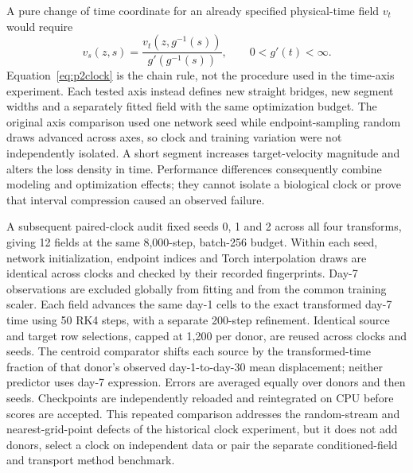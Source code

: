 A pure change of time coordinate for an already specified physical-time field $v_t$ would require
\begin{equation}
v_s(z,s)=\frac{v_t(z,g^{-1}(s))}{g'(g^{-1}(s))},\qquad 0<g'(t)<\infty.\label{eq:p2clock}
\end{equation}
Equation~\eqref{eq:p2clock} is the chain rule, not the procedure used in the time-axis experiment. Each tested axis instead defines new straight bridges, new segment widths and a separately fitted field with the same optimization budget. The original axis comparison used one network seed while endpoint-sampling random draws advanced across axes, so clock and training variation were not independently isolated. A short segment increases target-velocity magnitude and alters the loss density in time. Performance differences consequently combine modeling and optimization effects; they cannot isolate a biological clock or prove that interval compression caused an observed failure.

A subsequent paired-clock audit fixed seeds 0, 1 and 2 across all four transforms, giving 12 fields at the same 8,000-step, batch-256 budget. Within each seed, network initialization, endpoint indices and Torch interpolation draws are identical across clocks and checked by their recorded fingerprints. Day-7 observations are excluded globally from fitting and from the common training scaler. Each field advances the same day-1 cells to the exact transformed day-7 time using 50 RK4 steps, with a separate 200-step refinement. Identical source and target row selections, capped at 1,200 per donor, are reused across clocks and seeds. The centroid comparator shifts each source by the transformed-time fraction of that donor's observed day-1-to-day-30 mean displacement; neither predictor uses day-7 expression. Errors are averaged equally over donors and then seeds. Checkpoints are independently reloaded and reintegrated on CPU before scores are accepted. This repeated comparison addresses the random-stream and nearest-grid-point defects of the historical clock experiment, but it does not add donors, select a clock on independent data or pair the separate conditioned-field and transport method benchmark.

